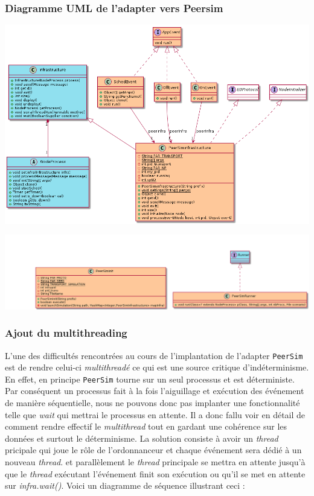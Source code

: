 \documentclass{article}
\begin{document}
							\subsubsection{Diagramme UML de l'adapter vers Peersim}
							\hspace*{-1.3cm} \includegraphics[width=17cm]{uml/peersim1.png}
		
							\hspace*{-3.2cm} \includegraphics[width=20cm]{uml/peersim2.png}
						
							\subsubsection{Ajout du multithreading}
							L’une des difficultés rencontrées au cours de l’implantation de l’adapter \verb|PeerSim| est de rendre celui-ci \emph{multithreadé} ce qui est une source critique d'indéterminisme.
	En effet, en principe \verb|PeerSim| tourne sur un seul processus et est déterministe. Par conséquent un processus fait à la fois l’aiguillage et exécution des événement de manière séquentielle, nous ne pouvons donc pas implanter une fonctionnalité telle que \emph{wait} qui mettrai le processus en attente. Il a donc fallu voir en détail de comment rendre effectif le \emph{multithread} tout en gardant une cohérence sur les données et surtout le déterminisme. 
	\newline
	\newline
	La solution consiste à avoir un \emph{thread} pricipale qui joue le rôle de l'ordonnanceur et chaque événement sera dédié à un nouveau \emph{thread}.  et parallèlement le \emph{thread} principale se mettra en attente jusqu’à que le \emph{thread} exécutant l’événement finit son exécution ou qu’il se met en attente sur \emph{infra.wait()}.
	\newline
	\newline
	Voici un diagramme de séquence illustrant ceci :
\end{document}
